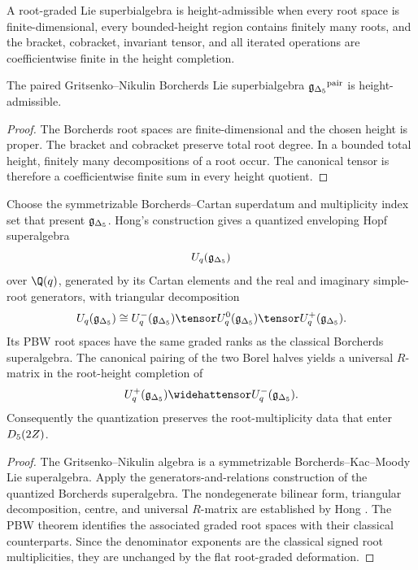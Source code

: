 \begin{definition}
A root-graded Lie superbialgebra is height-admissible when every root space is finite-dimensional, every bounded-height region contains finitely many roots, and the bracket, cobracket, invariant tensor, and all iterated operations are coefficientwise finite in the height completion.
\end{definition}

\begin{proposition}
The paired Gritsenko--Nikulin Borcherds Lie superbialgebra ${\mathfrak g_{\Delta_5}}^{\mathrm{pair}}$ is height-admissible.
\end{proposition}
\begin{proof}
The Borcherds root spaces are finite-dimensional and the chosen height is proper.  The bracket and cobracket preserve total root degree.  In a bounded total height, finitely many decompositions of a root occur.  The canonical tensor is therefore a coefficientwise finite sum in every height quotient.
\end{proof}

\begin{theorem}
Choose the symmetrizable Borcherds--Cartan superdatum and multiplicity index set that present ${\mathfrak g_{\Delta_5}}$.  Hong's construction gives a quantized enveloping Hopf superalgebra
\[
 U_q({\mathfrak g_{\Delta_5}})
\]
over $\Q(q)$, generated by its Cartan elements and the real and imaginary simple-root generators, with triangular decomposition
\[
 U_q(\gIg)\cong U_q^-(\gIg)\tensor U_q^0(\gIg)\tensor U_q^+(\gIg).
\]
Its PBW root spaces have the same graded ranks as the classical Borcherds superalgebra.  The canonical pairing of the two Borel halves yields a universal $R$-matrix in the root-height completion of
\[
 U_q^+(\gIg)\widehattensor U_q^-(\gIg).
\]
Consequently the quantization preserves the root-multiplicity data that enter ${D_5}(2Z)$.
\end{theorem}
\begin{proof}
The Gritsenko--Nikulin algebra is a symmetrizable Borcherds--Kac--Moody Lie superalgebra.  Apply the generators-and-relations construction of the quantized Borcherds superalgebra.  The nondegenerate bilinear form, triangular decomposition, centre, and universal $R$-matrix are established by Hong \cite{Hong98}.  The PBW theorem identifies the associated graded root spaces with their classical counterparts.  Since the denominator exponents are the classical signed root multiplicities, they are unchanged by the flat root-graded deformation.
\end{proof}

